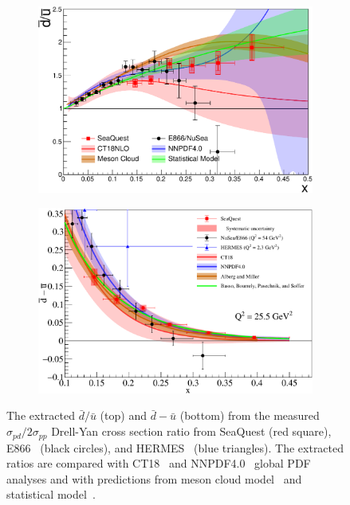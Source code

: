 \documentclass[reprint,aps,unsortedaddress,superscriptaddress,prl,floatfix,showpacs,linenumbers,final]{revtex4-2}
\begin{document}
\begin{figure}[htpb!]
	\centering
	\begin{subfigure}{\linewidth}
		\includegraphics[width=\linewidth]{E906_E866_dbarubar_PDF_model.pdf}
	\end{subfigure}
	\begin{subfigure}{\linewidth}
		\includegraphics[width=\linewidth]{dbub_diff.pdf}
	\end{subfigure}
	\caption{The extracted $\bar{d}/\bar{u}$ (top) and $\bar{d}-\bar{u}$ (bottom)
		from the measured $\sigma_{pd}/2\sigma_{pp}$ Drell-Yan cross section ratio
		from SeaQuest (red square), E866~\cite{towell2001} (black circles), and HERMES~\cite{ackerstaff1998} (blue triangles).
		The extracted ratios are compared with CT18~\cite{hou2021} and NNPDF4.0~\cite{ball2022a} global PDF analyses
		and with predictions from meson cloud model~\cite{alberg2022} and statistical model~\cite{soffer2019}.}
	\label{fig:e906_e866_dbarubar}
\end{figure}
\end{document}
